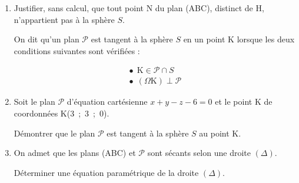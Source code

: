 \documentclass[10pt]{article}
\begin{document}
	\begin{enumerate}[resume]

\item Justifier, sans calcul, que tout point N du plan (ABC), distinct de H, n'appartient pas à la sphère $S$.

On dit qu'un plan $\mathcal{P}$ est tangent à la sphère $S$ en un point K lorsque les deux conditions suivantes sont vérifiées :

\[\begin{array}{l}
\bullet~~ \text{K} \in \mathcal{P} \cap S\\
\bullet~~ (\Omega\text{K}) \perp \mathcal{P}
\end{array}
\]
\item Soit le plan $\mathcal{P}$ d'équation cartésienne $x +y - z - 6 = 0$ et le point K de coordonnées K(3~;~3~;~0).

Démontrer que le plan $\mathcal{P}$ est tangent à la sphère $S$ au point K.
\item On admet que les plans (ABC) et $\mathcal{P}$ sont sécants selon une droite $(\Delta)$.

Déterminer une équation paramétrique de la droite $(\Delta)$.
\end{enumerate}

\bigskip
\end{document}
